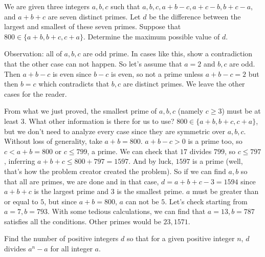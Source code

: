 \begin{problem}
	We are given three integers $a, b, c$ such that $a, b, c, a + b - c, a + c - b, b + c - a$, and $a + b + c$ are seven distinct primes. Let $d$ be the difference between the largest and smallest of these seven primes. Suppose that $800\in \{a+b, b+c, c+a\}$. Determine the maximum possible value of $d$.
\end{problem}

\begin{solution}
	Observation: all of $a,b,c$ are odd prime. In cases like this, show a contradiction that the other case can not happen. So let's assume that $a=2$ and $b,c$ are odd. Then $a+b-c$ is even since $b-c$ is even, so not a prime unless $a+b-c=2$ but then $b=c$ which contradicts that $b,c$ are distinct primes. We leave the other cases for the reader.

	From what we just proved, the smallest prime of $a,b,c$ (namely $c\geq3$) must be at least $3$. What other information is there for us to use? $800\in \{a+b, b+c, c+a\}$, but we don't need to analyze every case since they are symmetric over $a,b,c$. Without loss of generality, take $a+b=800$. $a+b-c>0$ is a prime too, so $c<a+b=800$ or $c\leq 799$, a prime. We can check that $17$ divides $799$, so $c\leq797$, inferring $a+b+c\leq800+797=1597$. And by luck, $1597$ is a prime (well, that's how the problem creator created the problem). So if we can find $a,b$ so that all are primes, we are done and in that case, $d=a+b+c-3=1594$ since $a+b+c$ is the largest prime and $3$ is the smallest prime. $a$ must be greater than or equal to $5$, but since $a+b=800$, $a$ can not be $5$. Let's check starting from $a=7,b=793$. With some tedious calculations, we can find that $a=13,b=787$ satisfies all the conditions. Other primes would be $23,1571$.
\end{solution}

\begin{problem}
	Find the number of positive integers $d$ so that for a given positive integer $n$, $d$ divides $a^n-a$ for all integer $a$.
\end{problem}

